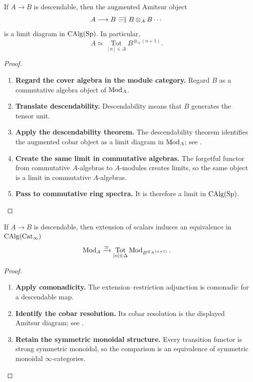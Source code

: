 \begin{theorem}
\label{thm:spectral-amitsur-convergence}
If $A\to B$ is descendable, then the augmented Amitsur object
\[
    A
    \longrightarrow
    B
    \triplearrows
    B\otimes_A B
    \cdots
\]
is a limit diagram in $\operatorname{CAlg}(\operatorname{Sp})$. In particular,
\[
    A
    \simeq
    \operatorname*{Tot}_{[n]\in\Delta}
    B^{\otimes_A(n+1)}.
\]
\end{theorem}

\begin{proof}
\leavevmode
\begin{enumerate}[label=\textup{(\arabic*)}]
    \item \textbf{Regard the cover algebra in the module category.}
    Regard $B$ as a commutative algebra object of $\operatorname{Mod}_A$.

    \item \textbf{Translate descendability.}
    Descendability
    means that $B$ generates the tensor unit.

    \item \textbf{Apply the descendability theorem.}
    The descendability theorem
    identifies the augmented cobar object as a limit diagram in $\operatorname{Mod}_A$; see
    \cite[Proposition~3.20]{MathewGaloisStableHomotopy}.

    \item \textbf{Create the same limit in commutative algebras.}
    The forgetful functor
    from commutative $A$-algebras to $A$-modules creates limits, so the same
    object is a limit in commutative $A$-algebras.

    \item \textbf{Pass to commutative ring spectra.}
    It is therefore a limit in
    $\operatorname{CAlg}(\operatorname{Sp})$.
\end{enumerate}
\end{proof}

\begin{theorem}
\label{thm:spectral-affine-module-descent}
If $A\to B$ is descendable, then extension of scalars induces an
equivalence in $\operatorname{CAlg}(\operatorname{Cat}_\infty)$
\[
    \operatorname{Mod}_A
    \xrightarrow{\simeq}
    \operatorname*{Tot}_{[n]\in\Delta}
    \operatorname{Mod}_{B^{\otimes_A(n+1)}}.
\]
\end{theorem}

\begin{proof}
\leavevmode
\begin{enumerate}[label=\textup{(\arabic*)}]
    \item \textbf{Apply comonadicity.}
    The extension--restriction adjunction is comonadic for a descendable map.

    \item \textbf{Identify the cobar resolution.}
    Its cobar resolution is the displayed Amitsur diagram; see
    \cite[Proposition~3.22]{MathewGaloisStableHomotopy}.

    \item \textbf{Retain the symmetric monoidal structure.}
    Every transition
    functor is strong symmetric monoidal, so the comparison is an equivalence
    of symmetric monoidal $\infty$-categories.
\end{enumerate}
\end{proof}

